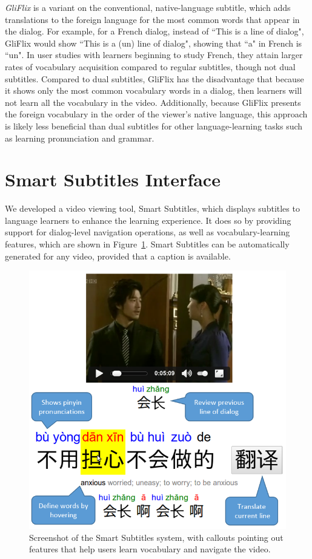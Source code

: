 \documentclass{sigchi}
\begin{document}
\emph{GliFlix} is a variant on the conventional, native-language subtitle, which adds translations to the foreign language for the most common words that
appear in the dialog. For example, for a French dialog, instead of ``This is a line of dialog", GliFlix would show ``This is a (un) line of dialog", showing that ``a" in French is ``un". In user studies with learners beginning to study French, they attain larger rates of vocabulary acquisition compared to regular
subtitles, though not dual subtitles. Compared to dual subtitles, GliFlix has the disadvantage that because it shows only the most common vocabulary words in a dialog, then learners will not learn all the vocabulary in the video. Additionally, because GliFlix presents the foreign vocabulary in the order of the viewer's native language, this approach is likely less beneficial than dual subtitles for
other language-learning tasks such as learning pronunciation and grammar.

\section{Smart Subtitles Interface}

We developed a video viewing tool, Smart Subtitles, which displays subtitles to language learners to enhance the learning experience. It does so by providing support for dialog-level navigation operations, as well as vocabulary-learning features, which are shown in Figure~\ref{fig:figure2}. Smart Subtitles can be automatically generated for any video, provided that a caption is available.

\begin{figure}[!h]
\centering
\includegraphics[width=\columnwidth]{smartsubs-features}
\caption{Screenshot of the Smart Subtitles system,
with callouts pointing out features that help users
learn vocabulary and navigate the video.}
\label{fig:figure2}
\end{figure}
\end{document}

